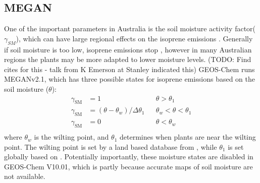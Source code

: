  
  \subsection{MEGAN}

    One of the important parameters in Australia is the soil moisture activity factor($\gamma_{SM}$), which can have large regional effects on the isoprene emissions \parencite{Sindelarova2014,Bauwens2016}.
    Generally if soil moisture is too low, isoprene emissions stop \parencite{Pegoraro2004,Niinemets2010}, however in many Australian regions the plants may be more adapted to lower moisture levels. (TODO: Find cites for this - talk from K Emerson at Stanley indicated this)
    GEOS-Chem runs MEGANv2.1, which has three possible states for isoprene emissions based on the soil moisture ($\theta$):
    \begin{align*}
    \gamma_\mathrm{SM} & = 1 && \theta > \theta_1 \\
    \gamma_\mathrm{SM} & = (\theta-\theta_w)/\Delta\theta_1  && \theta_w < \theta < \theta_1 \\
    \gamma_\mathrm{SM} & = 0 && \theta < \theta_w \\
    \end{align*}
    where $\theta_w$ is the wilting point, and $\theta_1$ determines when plants are near the wilting point.
    The wilting point is set by a land based database from \textcite{Chen2001}, while $\theta_1$ is set globally based on \textcite{Pegoraro2004}.
    Potentially importantly, these moisture states are disabled in GEOS-Chem V10.01, which is partly because accurate maps of soil moisture are not available.
  
%  
  
